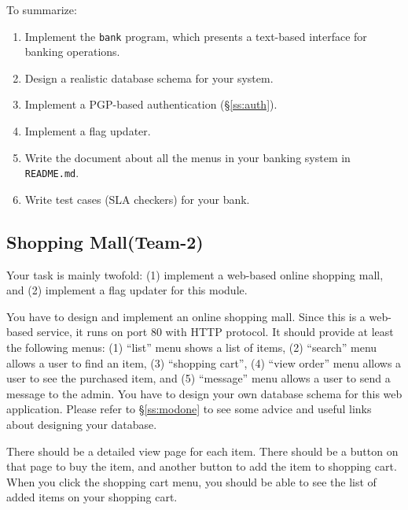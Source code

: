 \documentclass[a4paper, 11pt]{article}
\newcommand*{\Modtwo}{Shopping Mall\xspace}%
\theoremstyle{definition}
\begin{document}
{To summarize:
\begin{enumerate}

  \item Implement the \texttt{bank} program, which presents a
    text-based interface for banking operations.

  \item Design a realistic database schema for your system.

  \item Implement a PGP-based authentication (\S\ref{ss:auth}).

  \item Implement a flag updater.

  \item Write the document about all the menus in your banking system
    in \texttt{README.md}.

  \item Write test cases (SLA checkers) for your bank.

\end{enumerate}

\subsection{\Modtwo (Team-2)}

Your task is mainly twofold: (1) implement a web-based online shopping
mall, and (2) implement a flag updater for this module.

You have to design and implement an online shopping mall. Since this
is a web-based service, it runs on port 80 with HTTP protocol. It
should provide at least the following menus: (1) ``list'' menu shows a
list of items, (2) ``search'' menu allows a user to find an item, (3)
``shopping cart'', (4) ``view order'' menu allows a user to see the
purchased item, and (5) ``message'' menu allows a user to send a
message to the admin. You have to design your own database schema for
this web application. Please refer to \S\ref{ss:modone} to see some
advice and useful links about designing your database.

There should be a detailed view page for each item. There should be a
button on that page to buy the item, and another button to add the
item to shopping cart. When you click the shopping cart menu, you
should be able to see the list of added items on your shopping cart.

}
\end{document}
